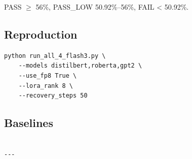 PASS $\ge$ 56\%, PASS\_LOW 50.92\%--56\%, FAIL < 50.92\%.

\subsection{Reproduction}

\begin{lstlisting}
python run_all_4_flash3.py \
    --models distilbert,roberta,gpt2 \
    --use_fp8 True \
    --lora_rank 8 \
    --recovery_steps 50
\end{lstlisting}

\subsection{Baselines}

\begin{lstlisting}

---
\end{lstlisting}